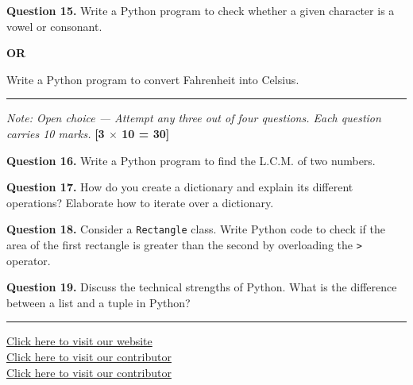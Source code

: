 \documentclass[11pt,a4paper]{article}
\begin{document}
\medskip\noindent\textbf{Question 15.} Write a Python program to check whether a given character is a vowel or consonant.
\centerline{\textbf{OR}}
Write a Python program to convert Fahrenheit into Celsius.

\bigskip{}
\rule{\linewidth}{0.4pt}\smallskip

\noindent\textit{Note: Open choice --- Attempt any three out of four questions. Each question carries 10 marks.} \hfill \textbf{[3 $\times$ 10 = 30]}

\medskip\noindent\textbf{Question 16.} Write a Python program to find the L.C.M. of two numbers.

\medskip\noindent\textbf{Question 17.} How do you create a dictionary and explain its different operations? Elaborate how to iterate over a dictionary.

\medskip\noindent\textbf{Question 18.} Consider a \texttt{Rectangle} class. Write Python code to check if the area of the first rectangle is greater than the second by overloading the \texttt{>} operator.

\medskip\noindent\textbf{Question 19.} Discuss the technical strengths of Python. What is the difference between a list and a tuple in Python?

\vfill
\rule{\linewidth}{0.4pt}
\begin{center}\small
\href{https://bhu-exam.vercel.app/}{Click here to visit our website}\\[4pt]\href{https://me-aryan.vercel.app/}{Click here to visit our contributor}\\[4pt]\href{https://quashan-me.vercel.app/}{Click here to visit our contributor}
\end{center}
\end{document}
